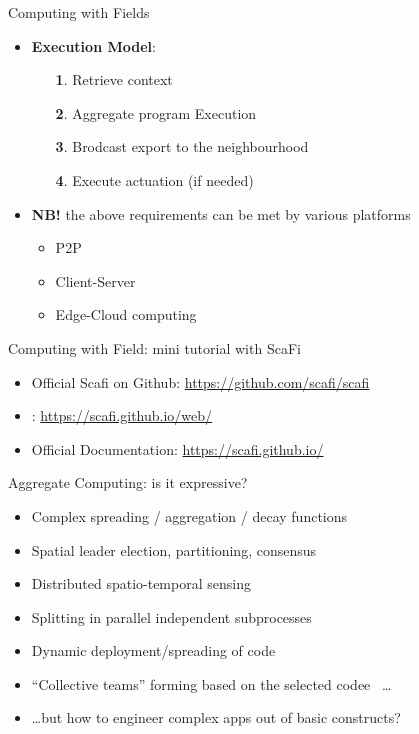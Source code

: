 \documentclass[8pt, aspectratio=169, handout]{beamer}
\begin{document}
\begin{frame}{Computing with Fields}
\begin{card}
\begin{itemize}
\begin{itemize}
    \end{itemize}
    \item \textbf{Execution Model}:
    \begin{enumerate}
      \item[\textbf{1}.] Retrieve context
      \item[\textbf{2}.] Aggregate program Execution
      \item[\textbf{3}.] Brodcast export to the neighbourhood
      \item[\textbf{4}.] Execute actuation (if needed)
    \end{enumerate}
    \item \textbf{NB!} the above requirements can be met by various platforms
    \begin{itemize}
      \item P2P
      \item Client-Server
      \item Edge-Cloud computing
    \end{itemize}
  \end{itemize}
\end{card}
\end{frame}
\begin{frame}{Computing with Field: mini tutorial with ScaFi}
  \begin{card}[References]
    \begin{itemize}
    \item Official Scafi on Github: \url{https://github.com/scafi/scafi}
    \item {}: \url{https://scafi.github.io/web/}
    \item Official Documentation: \url{https://scafi.github.io/}
    \end{itemize}
  \end{card}
  \centering
\end{frame}
\begin{frame}{Aggregate Computing: is it expressive?}
  \begin{card}
    \begin{itemize}
      \item Complex spreading / aggregation / decay functions~\cite{beal2015aggregate-programming}
      \item Spatial leader election, partitioning, consensus~\cite{damiani2015code}
      \item Distributed spatio-temporal sensing~\cite{viroli2016execution}
      \item Splitting in parallel independent subprocesses~\cite{viroli2016execution}
      \item Dynamic deployment/spreading of code~\cite{damiani2015code}
      \item ``Collective teams'' forming based on the selected codee~\cite{viroli2015multi} \dots
      \item \dots but how to engineer complex apps out of basic constructs?
    \end{itemize}
  \end{card}
\end{frame}
\end{document}
